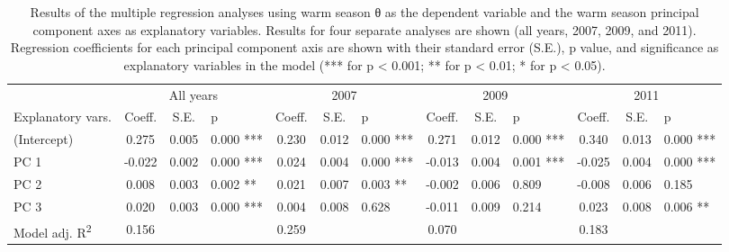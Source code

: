 
\begin{sidewaystable}

\centering

\caption{Results of the multiple regression analyses using warm season θ as the dependent variable and the warm season principal component axes as explanatory variables. Results for four separate analyses are shown (all years, 2007, 2009, and 2011). Regression coefficients for each principal component axis are shown with their standard error (S.E.), p value, and significance as explanatory variables in the model (*** for p < 0.001; ** for p < 0.01; * for p < 0.05).\label{reg_warm_theta_t}}

\begin{tabular}{lcclcclcclccl}
\toprule
{} & \multicolumn{3}{c}{All years}& \multicolumn{3}{c}{2007}& \multicolumn{3}{c}{2009}& \multicolumn{3}{c}{2011}\\

\cmidrule(l){2-4} \cmidrule(l){5-7} \cmidrule(l){8-10} \cmidrule(l){11-13}
Explanatory vars. &Coeff. &S.E. &p & Coeff. &S.E. &p & Coeff. &S.E. &p & Coeff. &S.E. &p  \\

\midrule
(Intercept)	&0.275	&0.005	&0.000	***	&0.230	&0.012	&0.000	***	&0.271	&0.012	&0.000	***	&0.340	&0.013	&0.000	***\\
PC 1	&-0.022	&0.002	&0.000	***	&0.024	&0.004	&0.000	***	&-0.013	&0.004	&0.001	***	&-0.025	&0.004	&0.000	***\\
PC 2	&0.008	&0.003	&0.002	**	&0.021	&0.007	&0.003	**	&-0.002	&0.006	&0.809		&-0.008	&0.006	&0.185	\\
PC 3	&0.020	&0.003	&0.000	***	&0.004	&0.008	&0.628		&-0.011	&0.009	&0.214		&0.023	&0.008	&0.006	**\\
Model adj. R\textsuperscript{2}	&0.156	&	&	&	0.259	&	&	&	0.070	&	&	&	0.183	&	&	\\
\bottomrule
\end{tabular}

\end{sidewaystable}
